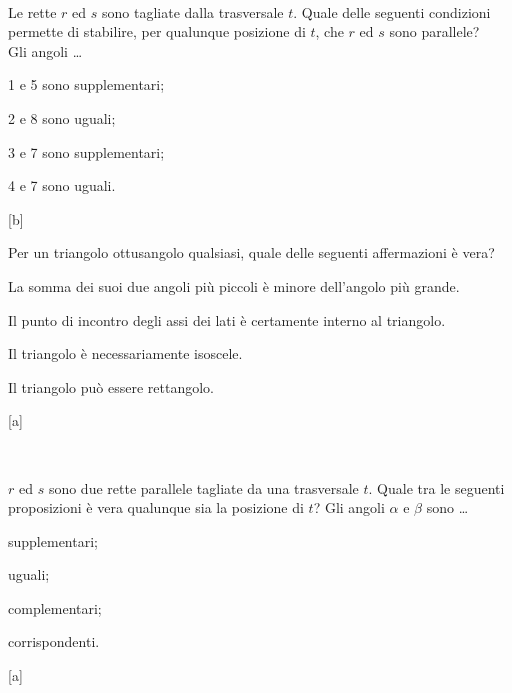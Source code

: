 \begin{esercizio}
\label{ese:3.112}
~\\
\noindent\begin{minipage}{0.6\textwidth}
Le rette \(r\) ed \(s\) sono tagliate dalla trasversale \(t\). Quale delle 
seguenti condizioni permette di stabilire, per qualunque posizione di 
\(t\), che \(r\) ed \(s\) sono parallele?\\
Gli angoli \ldots{}
\begin{enumeratea}
\item 1 e 5 sono supplementari;
\item 2 e 8 sono uguali;
\item 3 e 7 sono supplementari;
\item 4 e 7 sono uguali.
\end{enumeratea}
\end{minipage}\hfil
\begin{minipage}{0.4\textwidth}
\centering
\end{minipage}
\hfill [b]
\end{esercizio}

\begin{esercizio}
\label{ese:3.113}
Per un triangolo ottusangolo qualsiasi, quale delle seguenti 
affermazioni è vera?
\begin{enumeratea}
\item La somma dei suoi due angoli più piccoli è minore dell'angolo 
più grande.
\item Il punto di incontro degli assi dei lati è certamente interno 
al triangolo.
\item Il triangolo è necessariamente isoscele.
\item Il triangolo può essere rettangolo.
\end{enumeratea}
\vspace{-5mm}
\hfill [a]
\end{esercizio}

\begin{esercizio}
\label{ese:3.114}
~\\
\noindent\begin{minipage}{0.65\textwidth}
\(r\) ed \(s\) sono due rette parallele tagliate da una trasversale \(t\). 
Quale tra le seguenti proposizioni è vera qualunque sia la posizione 
di \(t\)?
Gli angoli \(\alpha\) e \(\beta\) sono \ldots{}
\begin{multicols}{2}
\begin{enumeratea}
\item supplementari;
\item uguali;
\item complementari;
\item corrispondenti.
\end{enumeratea}
\end{multicols}
\end{minipage}\hfil
\begin{minipage}{0.35\textwidth}
\centering
\end{minipage}
\hfill [a]
\end{esercizio}

